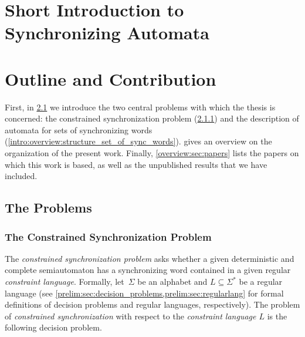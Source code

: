 
\chapter{Short Introduction to Synchronizing Automata}
\label{intro:chap:short_intro_sync_aut}
\label{intro:aut_and_formal_lang}



\chapter{Outline and Contribution}
\label{intro:chap:overview}

First, in \cref{overview:sec:problems} we introduce the two central 
problems with which the thesis is concerned: the constrained
synchronization problem (\cref{overview:sec:csp})
and the description of automata for sets of synchronizing 
words (\cref{intro:overview:structure_set_of_sync_words}).
 gives an overview on the 
organization of the present work.
Finally, \cref{overview:sec:papers} lists the papers on which this work is based, 
as well as the unpublished results that we have included.

\section{The Problems}
\label{overview:sec:problems}

\subsection{The Constrained Synchronization Problem}
\label{overview:sec:csp}

The \emph{constrained synchronization problem} asks whether a given
deterministic and complete
semiautomaton has  a synchronizing word contained
in a given regular \emph{constraint language}. 
Formally, let~$\Sigma$ be an alphabet 
and $L \subseteq \Sigma^*$ be a regular language 
(see \cref{prelim:sec:decision_problems,prelim:sec:regularlang}
for formal definitions of decision problems and regular languages, respectively).
The problem  of \emph{constrained synchronization} 
with respect to the \emph{constraint language $L$} is the following decision problem.

